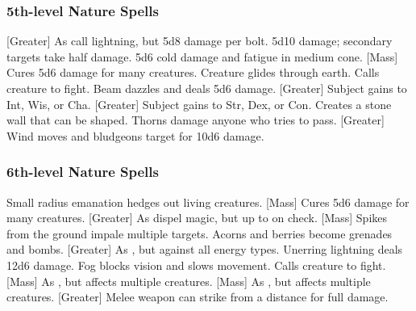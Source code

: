 \subsubsection{5th-level Nature Spells}
\begin{spelllist}
    [Greater] As call lightning, but 5d8 damage per bolt.
     5d10 damage; secondary targets take half damage.
     5d6 cold damage and fatigue in medium cone.
    [Mass] Cures 5d6 damage for many creatures.
     Creature glides through earth. 
     Calls creature to fight.
     Beam dazzles and deals 5d6 damage.
    [Greater] Subject gains  to Int, Wis, or Cha.
    [Greater] Subject gains  to Str, Dex, or Con.
     Creates a stone wall that can be shaped.
     Thorns damage anyone who tries to pass.
    [Greater] Wind moves and bludgeons target for 10d6 damage.
\end{spelllist}

\subsubsection{6th-level Nature Spells}
\begin{spelllist}
     Small radius emanation hedges out living creatures.
    [Mass] Cures 5d6 damage for many creatures.
    [Greater] As dispel magic, but up to  on check.
    [Mass] Spikes from the ground impale multiple targets.
     Acorns and berries become grenades and bombs.
    [Greater] As , but against all energy types.
     Unerring lightning deals 12d6 damage.
     Fog blocks vision and slows movement.
     Calls creature to fight.
    [Mass] As , but affects multiple creatures.
    [Mass] As , but affects multiple creatures.
    [Greater] Melee weapon can strike from a distance for full damage.
\end{spelllist}

